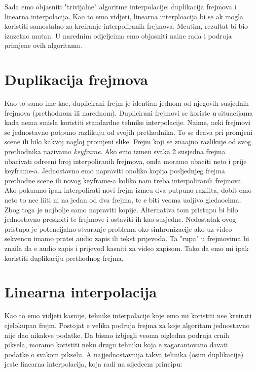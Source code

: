 Sada \cj emo objasniti "trivijalne" algoritme interpolacije: duplikacija frejmova i linearna interpolacija. Kao \sh to \cj emo vidjeti, linearna interploacija bi se \ch ak mogla koristiti samostalno za kreiranje interpoliranih
frejmova. Me\dj utim, rezultat bi bio izuzetno mutan. U narednim odjeljcima \cj emo objasniti na\ch ine rada i podru\cj ja primjene ovih algoritama.

\section{Duplikacija frejmova}
Kao \sh to samo ime ka\zh e, duplicirani frejm je identi\ch an jednom od njegovih susjednih frejmova (prethodnom ili narednom). Duplicirani frejmovi se koriste u situacijama kada nema smisla koristiti standardne tehnike
interpolacije. Naime, neki frejmovi se jednostavno potpuno razlikuju od svojih prethodnika. To se de\sh ava pri promjeni scene ili bilo kakvoj nagloj promjeni slike. Frejm koji se zna\ch ajno razlikuje od svog prethodnika
nazivamo \textit{keyframe}.  Ako \cj emo izme\dj u svaka 2 susjedna frejma ubacivati odre\dj eni broj interpoliranih frejmova, onda moramo ubaciti ne\sh to i prije keyframe-a. Jednostavno \cj emo napraviti onoliko kopija
posljednjeg frejma prethodne scene ili novog keyframe-a koliko nam treba interpoliranih frejmova. Ako poku\sh amo ipak interpolirati novi frejm izme\dj u dva putpuno razli\ch ita, dobit \cj emo ne\sh to \sh to ne\cj e
li\ch iti ni na jedan od dva frejma, te \cj e biti veoma uo\ch ljivo gledaocima. Zbog toga je najbolje samo napraviti kopije. Alternativa tom pristupu bi bilo jednostavno presko\ch iti te frejmove i ostaviti ih kao susjedne.
Nedostatak ovog pristupa je potencijalno stvaranje problema oko sinhronizacije ako uz video sekvencu imamo prate\cj i audio zapis ili tekst prijevoda. Ta "rupa" u frejmovima bi zna\ch ila da \cj e audio zapis i prijevod
kasniti za video zapisom. Tako da \cj emo mi ipak koristiti duplikaciju prethodnog frejma.

\section{Linearna interpolacija}
Kao \sh to \cj emo vidjeti kasnije, tehnike interpolacije koje \cj emo mi koristiti ne\cj e kreirati cjelokupan frejm. Postojat \cj e velika podru\ch ja frejma za koje algoritam jednostavno nije dao nikakve podatke. Da bismo
izbjegli veoma o\ch igledna podru\ch ja crnih piksela, moramo koristiti neku drugu tehniku koja \cj e zagarantovano davati podatke o svakom pikselu. A najjednostavnija takva tehnika (osim duplikacije) jeste linearna
interpolacija, koja radi na sljede\cj em principu: 

